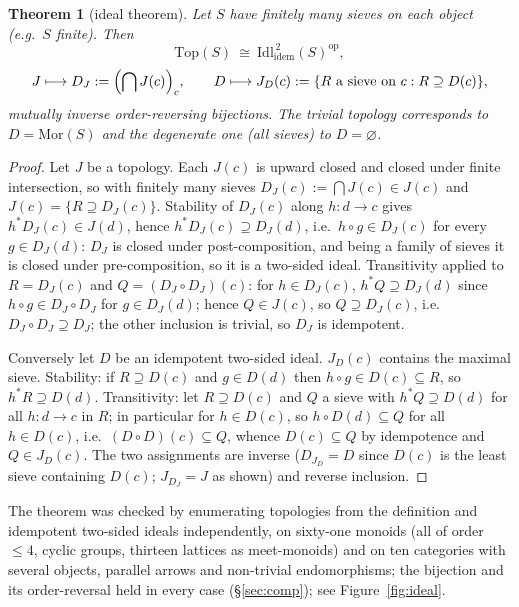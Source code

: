 \documentclass[11pt]{amsart}
\newtheorem{thm}{Theorem}[section]
\theoremstyle{definition}
\newcommand{\Top}{\mathrm{Top}}
\newcommand{\Mor}{\mathrm{Mor}}
\newcommand{\Idem}{\mathrm{Idl}^{\,2}_{\mathrm{idem}}}
\begin{document}
\begin{thm}[ideal theorem]\label{thm:ideal}
Let $S$ have finitely many sieves on each object (e.g.\ $S$ finite). Then
\[
\Top(S)\ \cong\ \Idem(S)^{\mathrm{op}},
\]
\[
J\longmapsto D_J:=\Bigl(\bigcap J(c)\Bigr)_{c},\qquad
D\longmapsto J_D(c):=\{R\text{ a sieve on }c: R\supseteq D(c)\},
\]
mutually inverse order-reversing bijections. The trivial topology corresponds
to $D=\Mor(S)$ and the degenerate one (all sieves) to $D=\varnothing$.
\end{thm}
\begin{proof}
Let $J$ be a topology. Each $J(c)$ is upward closed and closed under finite
intersection, so with finitely many sieves $D_J(c):=\bigcap J(c)\in J(c)$ and
$J(c)=\{R\supseteq D_J(c)\}$. Stability of $D_J(c)$ along $h\colon d\to c$ gives
$h^*D_J(c)\in J(d)$, hence $h^*D_J(c)\supseteq D_J(d)$, i.e.\ $h\circ g\in
D_J(c)$ for every $g\in D_J(d)$: $D_J$ is closed under post-composition, and
being a family of sieves it is closed under pre-composition, so it is a
two-sided ideal. Transitivity applied to $R=D_J(c)$ and $Q=(D_J\circ D_J)(c)$:
for $h\in D_J(c)$, $h^*Q\supseteq D_J(d)$ since $h\circ g\in D_J\circ D_J$ for
$g\in D_J(d)$; hence $Q\in J(c)$, so $Q\supseteq D_J(c)$, i.e.\ $D_J\circ
D_J\supseteq D_J$; the other inclusion is trivial, so $D_J$ is idempotent.

Conversely let $D$ be an idempotent two-sided ideal. $J_D(c)$ contains the
maximal sieve. Stability: if $R\supseteq D(c)$ and $g\in D(d)$ then $h\circ
g\in D(c)\subseteq R$, so $h^*R\supseteq D(d)$. Transitivity: let $R\supseteq
D(c)$ and $Q$ a sieve with $h^*Q\supseteq D(d)$ for all $h\colon d\to c$ in $R$;
in particular for $h\in D(c)$, so $h\circ D(d)\subseteq Q$ for all $h\in D(c)$,
i.e.\ $(D\circ D)(c)\subseteq Q$, whence $D(c)\subseteq Q$ by idempotence and
$Q\in J_D(c)$. The two assignments are inverse ($D_{J_D}=D$ since $D(c)$ is the
least sieve containing $D(c)$; $J_{D_J}=J$ as shown) and reverse inclusion.
\end{proof}

The theorem was checked by enumerating topologies from the definition and
idempotent two-sided ideals independently, on sixty-one monoids (all of
order $\le 4$, cyclic groups, thirteen lattices as meet-monoids) and on ten
categories with several objects, parallel arrows and non-trivial
endomorphisms; the bijection and its order-reversal held in every case
(\S\ref{sec:comp}); see Figure~\ref{fig:ideal}.
\end{document}
